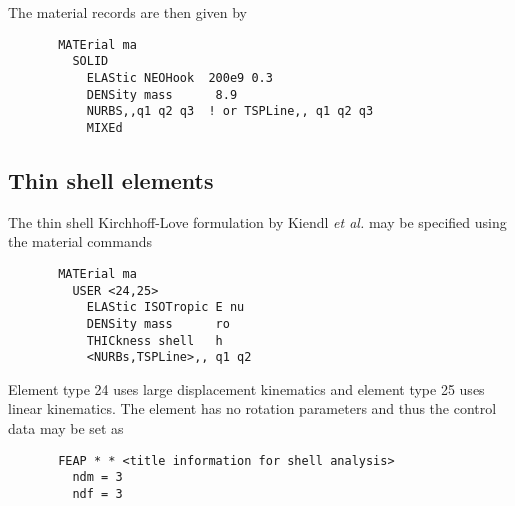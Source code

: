 The material records are then given by
\begin{verbatim}
       MATErial ma
         SOLID
           ELAStic NEOHook  200e9 0.3
           DENSity mass      8.9
           NURBS,,q1 q2 q3  ! or TSPLine,, q1 q2 q3
           MIXEd
\end{verbatim}

\subsection{Thin shell elements}

The thin shell Kirchhoff-Love formulation by
Kiendl \textit{et al.} may be specified using the
material commands
\begin{verbatim}
       MATErial ma
         USER <24,25> 
           ELAStic ISOTropic E nu
           DENSity mass      ro
           THICkness shell   h
           <NURBs,TSPLine>,, q1 q2
\end{verbatim}
Element type 24 uses large displacement kinematics and
element type 25 uses linear kinematics.
The element has no rotation parameters and thus the control data may be set
as
\begin{verbatim}
       FEAP * * <title information for shell analysis>
         ndm = 3
         ndf = 3
\end{verbatim}

